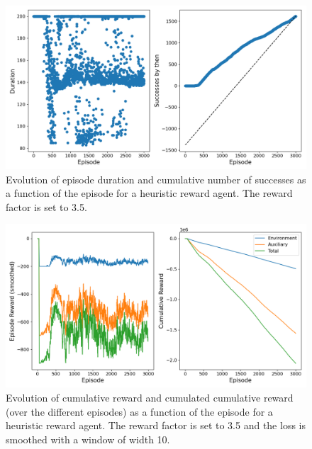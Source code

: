 \documentclass[a4paper, 12pt,oneside]{article}
\begin{document}
        \begin{figure}[h!]
            \centering
            \vspace{0em}
            \includegraphics[width=.75\textwidth]{../runs/dqn_heuristic/up-tau=3_d=2_frac=3.5/figs/duration}
            \caption{Evolution of episode duration and cumulative number of successes as a function of the episode for a heuristic reward agent. The reward factor is set to 3.5.}
            \label{fig:dqn-heuristic-frac=3.5-duration}
        \end{figure}
        \begin{figure}[h!]
            \centering
            \vspace{0em}
            \includegraphics[width=.75\textwidth]{../runs/dqn_heuristic/up-tau=3_d=2_frac=3.5/figs/reward}
            \caption{Evolution of cumulative reward and cumulated cumulative reward (over the different episodes) as a function of the episode for a heuristic reward agent. The reward factor is set to 3.5 and the loss is smoothed with a window of width 10.}
            \label{fig:dqn-heuristic-frac=3.5-reward}
        \end{figure}
\end{document}
